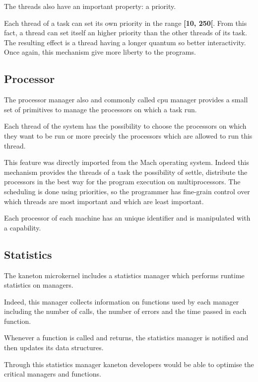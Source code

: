 \begin{multicols}{2}
The threads also have an important property: a priority.

Each thread of a task can set its own priority in the range \textbf{[10, 250[}.
From this fact, a thread can set itself an higher priority than the other
threads of its task. The resulting effect is a thread having a longer quantum
so better interactivity. Once again, this mechanism give more liberty to the
programs.

%
%

\subsection{Processor}

The processor manager also and commonly called cpu manager provides a small
set of primitives to manage the processors on which a task run.

Each thread of the system has the possibility to choose the processors
on which they want to be run or more precisly the processors which are allowed
to run this thread.

This feature was directly imported from the Mach operating system.
Indeed this mechanism provides the threads of a task the possibility of
settle, distribute the processors in the best way for the program
execution on multiprocessors. The scheduling is done using priorities,
so the programmer has fine-grain control over which threads
are most important and which are least important.

Each processor of each machine has an unique identifier and is manipulated
with a capability.

%
%

\subsection{Statistics}

The kaneton microkernel includes a statistics manager which performs
runtime statistics on managers.

Indeed, this manager collects information on functions used by each manager
including the number of calls, the number of errors and the time passed
in each function.

Whenever a function is called and returns, the statistics manager is notified
and then updates its data structures.

Through this statistics manager kaneton developers would be able to optimise
the critical managers and functions.


\end{multicols}
